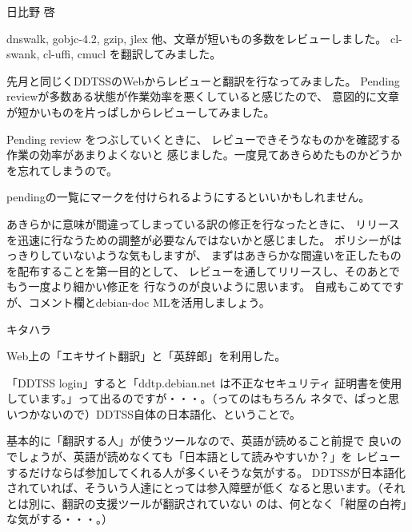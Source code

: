 \begin{prework}{日比野 啓}

dnswalk, gobjc-4.2, gzip, jlex 他、文章が短いもの多数をレビューしました。
cl-swank, cl-uffi, cmucl を翻訳してみました。


先月と同じくDDTSSのWebからレビューと翻訳を行なってみました。
Pending reviewが多数ある状態が作業効率を悪くしていると感じたので、
意図的に文章が短かいものを片っぱしからレビューしてみました。


Pending review をつぶしていくときに、
レビューできそうなものかを確認する作業の効率があまりよくないと
感じました。一度見てあきらめたものかどうかを忘れてしまうので。


pendingの一覧にマークを付けられるようにするといいかもしれません。

あきらかに意味が間違ってしまっている訳の修正を行なったときに、
リリースを迅速に行なうための調整が必要なんではないかと感じました。
ポリシーがはっきりしていないような気もしますが、
まずはあきらかな間違いを正したものを配布することを第一目的として、
レビューを通してリリースし、そのあとでもう一度より細かい修正を
行なうのが良いように思います。
自戒もこめてですが、コメント欄とdebian-doc MLを活用しましょう。

\end{prework}

\begin{prework}{キタハラ}


Web上の「エキサイト翻訳」と「英辞郎」を利用した。


「DDTSS login」すると「ddtp.debian.net は不正なセキュリティ
証明書を使用しています。」って出るのですが・・・。（ってのはもちろん
ネタで、ぱっと思いつかないので）DDTSS自体の日本語化、ということで。


基本的に「翻訳する人」が使うツールなので、英語が読めること前提で
良いのでしょうが、英語が読めなくても「日本語として読みやすいか？」を
レビューするだけならば参加してくれる人が多くいそうな気がする。
DDTSSが日本語化されていれば、そういう人達にとっては参入障壁が低く
なると思います。（それとは別に、翻訳の支援ツールが翻訳されていない
のは、何となく「紺屋の白袴」な気がする・・・。）
\end{prework}


